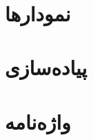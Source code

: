 \newpage
\appendix 
{
	\protect\renewcommand\protect\cftchappresnum{\appendixname~}%
	\protect\setlength{\cftchapnumwidth}{\mylenapp}
}%




\chapter{نمودارها}\label{appendix:1}
\thispagestyle{empty}

\chapter{پیاده‌سازی}



\chapter{واژه‌نامه}